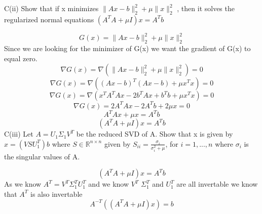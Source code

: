\documentclass{report}
\begin{document}
\newline
\newline
\newline
\newline
\noindent C(ii)
\newline
Show that if x minimizes $\| Ax-b \|_2^2 + \mu \| x \|_2^2$ , then it solves the regularized normal
equations $(A^TA + \mu I) x = A^Tb$
\newtheorem{problem}{C(ii)}
\begin{equation}
  G(x) = \| Ax-b \|_2^2 + \mu \| x \|_2^2
\end{equation}
Since we are looking for the minimizer of G(x) we want the gradient of G(x) to equal zero.
\begin{equation}
  \nabla G(x) = \nabla (\| Ax-b \|_2^2 + \mu \| x \|_2^2) = 0 \end{equation}
  \begin{equation}
  \nabla G(x) = \nabla ((Ax-b)^T(Ax-b) + \mu x^Tx) = 0 \end{equation}
  \begin{equation}
  \nabla G(x) = \nabla (x^TA^TAx-2b^TAx+b^Tb + \mu x^Tx) = 0 \end{equation}
  \begin{equation}
  \nabla G(x) =  2A^TAx-2A^Tb + 2\mu x = 0 \end{equation}
    \begin{equation}
  A^TAx + \mu x = A^Tb
\end{equation}
 \begin{equation}
  (A^TA + \mu I) x = A^Tb
\end{equation}
\setcounter{equation}{0}
\newline
\newline
\newline
\newline
\noindent C(iii)
\newline
Let $A=U_1\Sigma_1V^T$ be the reduced SVD of A. Show that x is given by $x = (VSU_1^T)b$ where $S \in \mathbb{R}^{n\times n}$ given by $S_{ii}=\frac{\sigma_i}{\sigma_i^2+\mu}$, for $i=1,...,n$ where $\sigma_i$ is the singular values of A.
\newtheorem{problem_2}{C(iii)}
 \begin{equation}
  (A^TA + \mu I)x = A^Tb
\end{equation}
As we know $A^{T}=V^T\Sigma_1^TU_1^{T}$ and we know $V^T$ $\Sigma_1^T$ and $U_1^{T}$ are all invertable we know that $A^{T}$ is also invertable
 \begin{equation}
 A^{-T}((A^TA + \mu I)x) = b
\end{equation}
\end{document}
